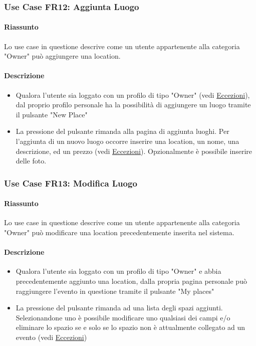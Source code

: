 \documentclass[9pt]{extarticle}
\begin{document}
\subsubsection*{Use Case FR12: Aggiunta Luogo}

\paragraph{Riassunto}

Lo use case in questione descrive come un utente appartenente alla categoria "Owner" può aggiungere una location.

\paragraph{Descrizione}

\begin{itemize}
	\item Qualora l'utente sia loggato con un profilo di tipo "Owner" (vedi \hyperref[Eccezioni-FR12-13]{Eccezioni}), dal proprio profilo personale ha la possibilità di aggiungere un luogo tramite il pulsante "New Place"
	\item La pressione del pulsante rimanda alla pagina di aggiunta luoghi. Per l'aggiunta di un nuovo luogo occorre inserire una location, un nome, una descrizione, ed un prezzo (vedi \hyperref[Eccezioni-FR12-13]{Eccezioni}). Opzionalmente è possibile inserire delle foto.
\end{itemize}

\subsubsection*{Use Case FR13: Modifica Luogo}

\paragraph{Riassunto}

Lo use case in questione descrive come un utente appartenente alla categoria "Owner" può modificare una location precedentemente inserita nel sistema.

\paragraph{Descrizione}

\begin{itemize}
	\item Qualora l'utente sia loggato con un profilo di tipo "Owner" e abbia precedentemente aggiunto una location, dalla propria pagina personale può raggiungere l'evento in questione tramite il pulsante "My places"
	\item La pressione del pulsante rimanda ad una lista degli spazi aggiunti. Selezionandone uno è possibile modificare uno qualsiasi dei campi e/o eliminare lo spazio se e solo se lo spazio non è attualmente collegato ad un evento (vedi \hyperref[Eccezioni-FR12-13]{Eccezioni})
\end{itemize}
\end{document}
